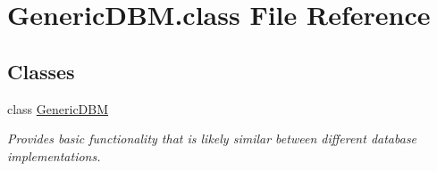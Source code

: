 \hypertarget{GenericDBM_8class}{\section{Generic\-D\-B\-M.\-class File Reference}
\label{GenericDBM_8class}
}
\subsection*{Classes}
\begin{DoxyCompactItemize}
\item 
class \hyperlink{classGenericDBM}{Generic\-D\-B\-M}
\begin{DoxyCompactList}\small\item\em Provides basic functionality that is likely similar between different database implementations. \end{DoxyCompactList}\end{DoxyCompactItemize}

